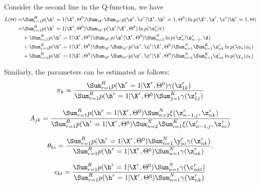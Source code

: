 Consider the second
line in the Q-function, we have
\begin{align*}
L(\Theta) = &
\Sum_{r=1}^R p(\h^r = 1| \X^r, \Theta^0) \Sum_{\z^r} \Sum_{\c^r} p( \z^r, \c^r| \X^r, \h^r = 1,\Theta^0) \ln p(\X^r, \z^r, \c^r| \h^r=1, \Theta) \\
= & \Sum_{r=1}^R p(\h^r = 1| \X^r, \Theta^0) \Sum_{\z^r} p(\z^r | \X^r, \Theta^0) \ln p(\z^r_1 | \pi) \\
& + \Sum_{r=1}^R p(\h^r = 1| \X^r, \Theta^0) \Sum_{\z^r} p(\z^r | \X^r, \Theta^0) \Sum_{n=2}^N \ln p(\z^r_n | \z^r_{n-1}, \A) \\
& + \Sum_{r=1}^R p(\h^r = 1| \X^r, \Theta^0) \Sum_{\z^r} \Sum_{\c^r} p(\z^r, \c^r| \X^r, \Theta^0) \Sum_{n=1}^N \Sum_{k=1}^K \z^r_{nk} \ln p(\o_n | \phi_k) \\
& +\Sum_{r=1}^R p(\h^r = 1| \X^r, \Theta^0)  \Sum_{\z^r} \Sum_{\c^r} p(\z^r, \c^r| \X^r, \Theta^0) \Sum_{n=1}^N \Sum_{k=1}^K \z^r_{nk} \ln p(\y_n | \phi_k) \\
\end{align*}

Similarly, the parameters can be estimated as follows:
$$
\pi_k = \frac{\Sum_{r=1}^R p(\h^r = 1| \X^r, \Theta^0) \gamma(\z_{1k}^r)} 
{\Sum_{r=1}^R p(\h^r = 1| \X^r, \Theta^0) \Sum_{j=1}^K  \gamma(\z_{1j}^r)} 
$$

$$
A_{jk} = \frac{ \Sum_{r=1}^R p(\h^r = 1| \X^r, \Theta^0) \Sum_{n=2}^N \xi(\z_{n-1, j}^r, \z_{nk}^r )}
{ \Sum_{r=1}^R p(\h^r = 1| \X^r, \Theta^0) \Sum_{n=2}^N \Sum_{i=1}^K \xi(\z_{n-1, j}^r, \z_{ni}^r )}
$$

$$
\theta_{ki} = \frac{\Sum_{r=1}^R p(\h^r = 1| \X^r, \Theta^0)  \Sum_{n=1}^N \y_{ni}^r \gamma(\z_{nk}^r)}
{\Sum_{r=1}^R p(\h^r = 1| \X^r, \Theta^0) \Sum_{n=1}^N \gamma(\z_{nk}^r)}.
$$


$$
  c_{kl} =  \frac{\Sum_{r=1}^R p(\h^r = 1| \X^r, \Theta^0) \Sum_{n=1}^N \gamma(\c_{nkl}^r)}
  {\Sum_{r=1}^R p(\h^r = 1| \X^r, \Theta^0) \Sum_{n=1}^N \gamma(\z_{nk}^r)}
$$

